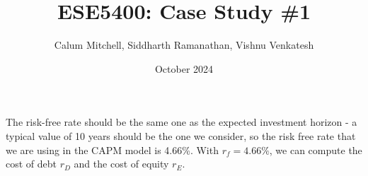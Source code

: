 \documentclass[letterpaper]{article}
\title{ESE5400: Case Study \#1}
\author{Calum Mitchell, Siddharth Ramanathan, Vishnu Venkatesh}
\date{October 2024}
\begin{document}
\maketitle

The risk-free rate should be the same one as the expected investment horizon - a typical value of 10 years should be the one we consider, so the risk free rate that we are using in the CAPM model is 4.66\%. With $r_f = 4.66\%$, we can compute the cost of debt $r_D$ and the cost of equity $r_E$.
\end{document}
